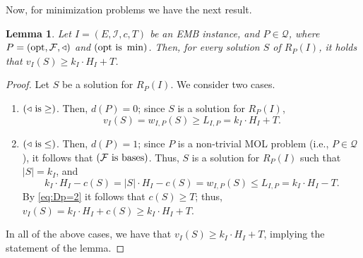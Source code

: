 \documentclass[11pt,letter]{article}
\newcommand{\opt}{\textnormal{opt}}
\newcommand{\bases}{\textnormal{bases}}
\newcommand{\cQ}{{\mathcal{Q}}}
\newcommand{\cI}{{\mathcal{I}}}
\newcommand{\cF}{{\mathcal{F}}}
\newcommand{\OPT}{\textnormal{OPT}}
\newtheorem{lemma}{Lemma}[section]
\begin{document}
Now, for minimization problems we have the next result. 
	\begin{lemma}
	\label{lem:OptMinBound}
	Let $I =(E,\cI,c,T)$ be an \textnormal{EMB} instance, and $P \in \cQ$, where $P = (\opt,\cF,\triangleleft)$ and $\left(\opt \textnormal{ is } \min\right)$. Then, for every solution $S$ of $R_P(I)$, it holds that $v_I(S) \geq k_I \cdot H_I+T$.  %
\end{lemma}

\begin{proof}
	Let $S$ be a solution for $R_P(I)$. We consider two cases. 
	\begin{enumerate}
		\item $(\triangleleft \textnormal{ is}   \geq)$. Then, $d(P) = 0$; since $S$ is a solution for $R_P(I)$, $$v_I(S) = w_{I,P}(S) \geq L_{I,P} = k_I \cdot H_I+T.$$ 
		\item  $(\triangleleft \textnormal{ is}   \leq)$. Then, $d(P) = 1$; since $P$ is a non-trivial MOL problem (i.e., $P \in \cQ$), it follows that $\left(\cF \textnormal{ is } \bases\right)$. Thus, $S$ is a solution for $R_P(I)$ such that $|S| = k_I$, and
		\begin{equation}
			\label{eq:Dp=2}
			 	  k_I \cdot H_I-c(S)= |S| \cdot H_I-c(S) =w_{I,P}(S) \leq L_{I,P} = k_I \cdot H_I-T.
		\end{equation} 
		By \eqref{eq:Dp=2} it follows that $c(S) \geq T$; thus, $v_I(S) = k_I \cdot H_I+c(S) \geq k_I \cdot H_I+T$. 
	\end{enumerate}
In all of the above cases, we have that $v_I(S) \geq k_I \cdot H_I+T$, implying the statement of the lemma. 
\end{proof}
\end{document}
